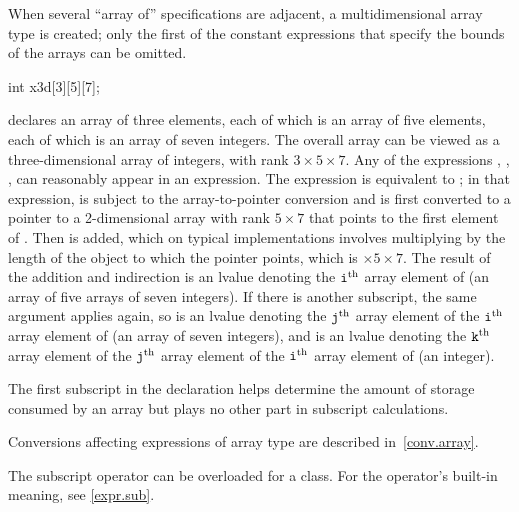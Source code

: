 \pnum
{}%
\begin{note}
When several ``array of'' specifications are adjacent,
a multidimensional array type is created;
only the first of the constant expressions
that specify the bounds of the arrays can be omitted.
\begin{example}
\begin{codeblock}
int x3d[3][5][7];
\end{codeblock}
declares an array of three elements,
each of which is an array of five elements,
each of which is an array of seven integers.
The overall array can be viewed as a
three-dimensional array of integers,
with rank $3 \times 5 \times 7$.
Any of the expressions
,
,
,
can reasonably appear in an expression.
The expression
is equivalent to
;
in that expression,
is subject to the array-to-pointer conversion
and is first converted to
a pointer to a 2-dimensional
array with rank
$5 \times 7$
that points to the first element of .
Then  is added,
which on typical implementations involves multiplying
 by the
length of the object to which the pointer points,
which is $ \times 5 \times 7$.
The result of the addition and indirection is
an lvalue denoting
the $\texttt{i}^\text{th}$ array element of
(an array of five arrays of seven integers).
If there is another subscript,
the same argument applies again, so
 is
an lvalue denoting
the $\texttt{j}^\text{th}$ array element of
the $\texttt{i}^\text{th}$ array element of
(an array of seven integers), and
 is
an lvalue denoting
the $\texttt{k}^\text{th}$ array element of
the $\texttt{j}^\text{th}$ array element of
the $\texttt{i}^\text{th}$ array element of
(an integer).
\end{example}
The first subscript in the declaration helps determine
the amount of storage consumed by an array
but plays no other part in subscript calculations.
\end{note}

\pnum
\begin{note}
Conversions affecting expressions of array type are described in~\ref{conv.array}.
\end{note}

\pnum
\begin{note}
The subscript operator can be overloaded for a class.
For the operator's built-in meaning, see \ref{expr.sub}.
\end{note}

